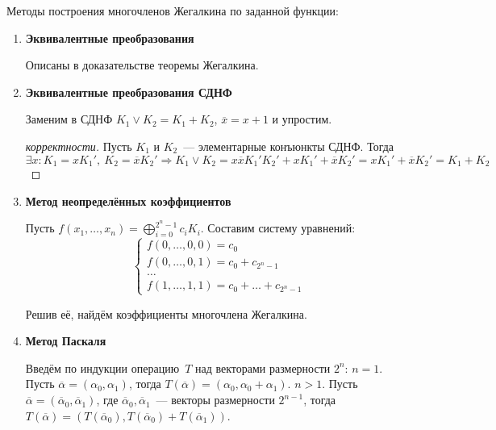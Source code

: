 Методы построения многочленов Жегалкина по заданной функции:
\begin{enumerate}
	\item \textbf{Эквивалентные преобразования}
	
	Описаны в доказательстве теоремы Жегалкина.
	
	\item \textbf{Эквивалентные преобразования СДНФ}
	
	Заменим в СДНФ $K_1 \lor K_2 = K_1 + K_2$, $\overline x = x + 1$ и упростим.
	\begin{proof}[корректности]
	Пусть $K_1$ и $K_2$~--- элементарные конъюнкты СДНФ.
	Тогда
	\begin{equation*}
	\exists x \colon K_1 = x K_1', \ K_2 = \overline x K_2' \Rightarrow
	K_1 \lor K_2 =
	x \overline x K_1' K_2' + x K_1' + \overline x K_2' =
	x K_1' + \overline x K_2' =
	K_1 + K_2
	\end{equation*}
	\end{proof}
	
	\item {} \textbf{Метод неопределённых коэффициентов}
	
	Пусть $f(x_1, \ldots, x_n) = \bigoplus_{i=0}^{2^n-1} c_i K_i$.
	Составим систему уравнений:
	\begin{equation*}
	\begin{cases}
	f(0, \ldots, 0, 0) = c_0 \\
	f(0, \ldots, 0, 1) = c_0 + c_{2^n-1} \\
	\ldots \\
	f(1, \ldots, 1, 1) = c_0 + \ldots + c_{2^n-1}
	\end{cases}
	\end{equation*}
	
	Решив её, найдём коэффициенты многочлена Жегалкина.
	
	\item {} \textbf{Метод Паскаля}
	
	Введём по индукции операцию~$T$ над векторами размерности $2^n$:
		\indbase $n = 1$.
		Пусть $\overline\alpha = (\alpha_0, \alpha_1)$, тогда $T(\overline\alpha) = (\alpha_0, \alpha_0 + \alpha_1)$.
		\indstep $n > 1$.
		Пусть $\overline\alpha = (\overline\alpha_0, \overline\alpha_1)$, где
		$\overline\alpha_0, \overline\alpha_1$~--- векторы размерности $2^{n-1}$, тогда
		$T(\overline\alpha) = (T(\overline\alpha_0), T(\overline\alpha_0) + T(\overline\alpha_1))$.
		\indend
		

\end{enumerate}

